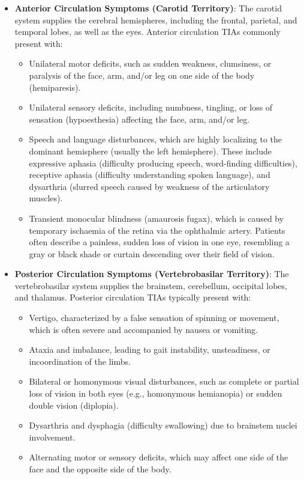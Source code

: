 \begin{itemize}
    \item \textbf{Anterior Circulation Symptoms (Carotid Territory)}: The carotid system supplies the cerebral hemispheres, including the frontal, parietal, and temporal lobes, as well as the eyes. Anterior circulation TIAs commonly present with:
    \begin{itemize}
        \item Unilateral motor deficits, such as sudden weakness, clumsiness, or paralysis of the face, arm, and/or leg on one side of the body (hemiparesis).
        \item Unilateral sensory deficits, including numbness, tingling, or loss of sensation (hypoesthesia) affecting the face, arm, and/or leg.
        \item Speech and language disturbances, which are highly localizing to the dominant hemisphere (usually the left hemisphere). These include expressive aphasia (difficulty producing speech, word-finding difficulties), receptive aphasia (difficulty understanding spoken language), and dysarthria (slurred speech caused by weakness of the articulatory muscles).
        \item Transient monocular blindness (amaurosis fugax), which is caused by temporary ischaemia of the retina via the ophthalmic artery. Patients often describe a painless, sudden loss of vision in one eye, resembling a gray or black shade or curtain descending over their field of vision.
    \end{itemize}

    \item \textbf{Posterior Circulation Symptoms (Vertebrobasilar Territory)}: The vertebrobasilar system supplies the brainstem, cerebellum, occipital lobes, and thalamus. Posterior circulation TIAs typically present with:
    \begin{itemize}
        \item Vertigo, characterized by a false sensation of spinning or movement, which is often severe and accompanied by nausea or vomiting.
        \item Ataxia and imbalance, leading to gait instability, unsteadiness, or incoordination of the limbs.
        \item Bilateral or homonymous visual disturbances, such as complete or partial loss of vision in both eyes (e.g., homonymous hemianopia) or sudden double vision (diplopia).
        \item Dysarthria and dysphagia (difficulty swallowing) due to brainstem nuclei involvement.
        \item Alternating motor or sensory deficits, which may affect one side of the face and the opposite side of the body.
    \end{itemize}
\end{itemize}


